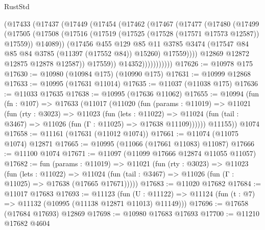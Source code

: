 \begin{lexlean}{RustStd}
\begin{coremodule}
                    (@17433
                      (@17437
                        (@17449
                          (@17454
                            (@17462
                              (@17467
                                (@17477
                                  (@17480
                                    (@17499
                                      (@17505
                                        (@17508
                                          (@17516
                                            (@17519 (@17525 (@17528 (@17571 @17573 @12587)) @17559))
                                            @14089))
                                        (@17456
                                          @455
                                          @129
                                          @85
                                          @11
                                          @3785
                                          @3474
                                          (@17547 @84 @85 @84 @3785 (@11397 (@17552 @84)) @15260)
                                          @17559))))
                                  @12869
                                  @12872
                                  @12875
                                  @12878
                                  @12587))
                              @17559))
                          @14352)))))))))))
@17626 := @10978 @175
@17630 := @10980 (@10984 @175) (@10990 @175)
@17631 := @10999 @12868
@17633 := @10995 (@17631 @11014)
@17635 := @11037 (@11038 @175)
@17636 := @11033 @17635
@17638 := @10995 (@17636 @11062)
@17655 := @10994
    (fun (fn : @107) =>
    @17633
      (@11017
        (@11020
          (fun (params : @11019) =>
          @11021
            (fun (rty : @3023) =>
            @11023
              (fun (lets : @11022) =>
              @11024 (fun (tail : @3467) => @11026 (fun (Γ : @11025) => @17638 @11109))))))
        @11155))
    @1074
@17658 := @11161 (@17631 (@11012 @1074))
@17661 := @11074 (@11075 @1074) @12871
@17665 := @10995 (@11066 (@17661 @11083) @11087)
@17666 := @11100 @1074
@17671 := @11097 (@11099 @17666 @12874 @11055 @11057)
@17682 := fun (params : @11019) =>
  @11021
    (fun (rty : @3023) =>
    @11023
      (fun (lets : @11022) =>
      @11024 (fun (tail : @3467) => @11026 (fun (Γ : @11025) => @17638 (@17665 @17671)))))
@17683 := @11020 @17682
@17684 := @11017 @17683
@17693 := @11123
    (fun (U : @11122) => @11124 (fun (t : @7) => @11132 (@10995 (@11138 @12871 @11013) @11149)))
@17696 := @17658 (@17684 @17693) @12869
@17698 := @10980 @17683 @17693
@17700 := @11210 @17682 @4604

\end{coremodule}
\end{lexlean}
